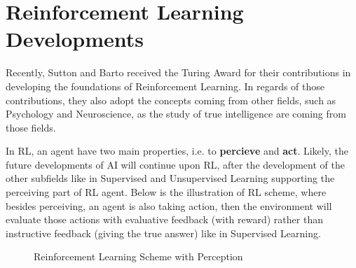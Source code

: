\usetikzlibrary{arrows, positioning, fit}

\section{Reinforcement Learning Developments}

Recently, Sutton and Barto received the Turing Award for their contributions in developing the foundations of Reinforcement Learning. In regards of those contributions, they also adopt the concepts coming from other fields, such as Psychology and Neuroscience, as the study of true intelligence are coming from those fields. 

In RL, an agent have two main properties, i.e. to \textbf{percieve} and \textbf{act}. Likely, the future developments of AI will continue upon RL, after the development of the other subfields like in Supervised and Unsupervised Learning supporting the perceiving part of RL agent. Below is the illustration of RL scheme, where besides perceiving, an agent is also taking action, then the environment will evaluate those actions with evaluative feedback (with reward) rather than instructive feedback (giving the true answer) like in Supervised Learning.
\begin{figure}[h]
    \centering
    \caption{Reinforcement Learning Scheme with Perception}
    \label{fig:rl_scheme}
\end{figure}